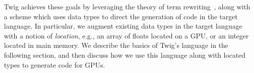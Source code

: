 Twig achieves these goals by leveraging the theory of term
rewriting~\cite{baader98rewriting}, along with a scheme which uses data types to
direct the generation of code in the target language. In particular, we augment
existing data types in the target language with a notion of \emph{location},
e.g., an array of floats located on a GPU, or an integer located in main memory.
We describe the basics of Twig's language in the following section, and then
discuss how we use this language along with located types to generate code for
GPUs.




